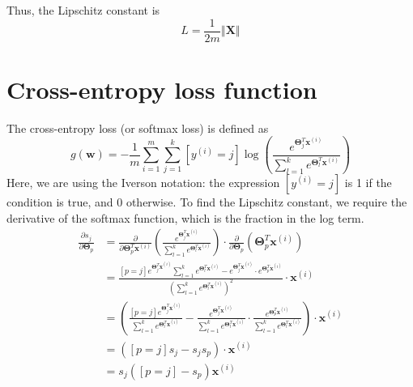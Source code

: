 \documentclass{article}
\begin{document}
Thus, the Lipschitz constant is
\[
    \boxed{
        L = \frac{1}{2m} \left\Vert \textbf{X} \right\Vert
    }
\]

\section{Cross-entropy loss function} 
The cross-entropy loss (or softmax loss) is defined as 
\[
    g(\textbf{w}) = -\frac{1}{m} \sum\limits_{i=1}^m \sum\limits_{j=1}^k [y^{(i)}=j] \log \left( \frac{e^{\boldsymbol\Theta_j^T \textbf{x}^{(i)}}}{\sum_{l=1}^k e^{\boldsymbol\Theta_l^T \textbf{x}^{(i)}}} \right)
\]
Here, we are using the Iverson notation: the expression $[y^{(i)}=j]$ is 1 if the condition is true, and 0 otherwise. To find the Lipschitz constant, we require the derivative of the softmax function, which is the fraction in the log term.
\[
    \begin{aligned} \frac{\partial s_j}{\partial \boldsymbol\Theta_p} &= \frac{\partial}{\partial \boldsymbol\Theta^T_p \textbf{x}^{(i)}} \left( \frac{e^{\boldsymbol\Theta^T_j \textbf{x}^{(i)}}}{\sum_{l=1}^k e^{\boldsymbol\Theta^T_l \textbf{x}^{(i)}}} \right) \cdot \frac{\partial}{\partial \boldsymbol\Theta_p} \left( \boldsymbol\Theta^T_p \textbf{x}^{(i)} \right)  \\ &= \frac{[p=j] e^{\boldsymbol\Theta^T_j \textbf{x}^{(i)}}\sum_{l=1}^k e^{\boldsymbol\Theta^T_l \textbf{x}^{(i)}} - e^{\boldsymbol\Theta^T_j \textbf{x}^{(i)}} \cdot e^{\boldsymbol\Theta^T_p \textbf{x}^{(i)}} }{\left( \sum_{l=1}^k e^{\boldsymbol\Theta^T_l \textbf{x}^{(i)}} \right)^2} \cdot \textbf{x}^{(i)} \\ &= \left( \frac{[p=j] e^{\boldsymbol\Theta^T_j \textbf{x}^{(i)}}}{\sum_{l=1}^k e^{\boldsymbol\Theta^T_l \textbf{x}^{(i)}}} - \frac{e^{\boldsymbol\Theta^T_j \textbf{x}^{(i)}}}{\sum_{l=1}^k e^{\boldsymbol\Theta^T_l \textbf{x}^{(i)}}} \cdot \frac{e^{\boldsymbol\Theta^T_p \textbf{x}^{(i)}}}{\sum_{l=1}^k e^{\boldsymbol\Theta^T_l \textbf{x}^{(i)}}} \right) \cdot \textbf{x}^{(i)} \\ &= \left([p=j] s_j - s_j s_p \right) \cdot \textbf{x}^{(i)} \\ &= s_j([p=j]-s_p)\textbf{x}^{(i)} \end{aligned}
\]
\end{document}
